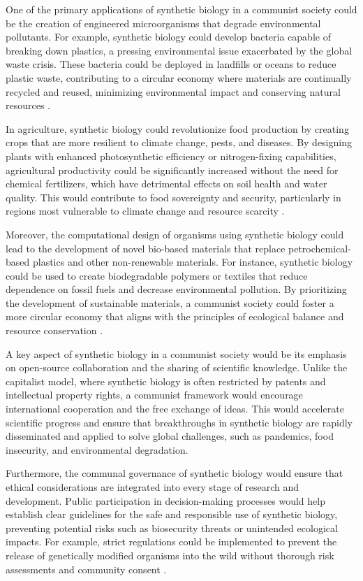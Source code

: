 One of the primary applications of synthetic biology in a communist society could be the creation of engineered microorganisms that degrade environmental pollutants. For example, synthetic biology could develop bacteria capable of breaking down plastics, a pressing environmental issue exacerbated by the global waste crisis. These bacteria could be deployed in landfills or oceans to reduce plastic waste, contributing to a circular economy where materials are continually recycled and reused, minimizing environmental impact and conserving natural resources \cite[pp.~220-225]{anderson2016biology}.

In agriculture, synthetic biology could revolutionize food production by creating crops that are more resilient to climate change, pests, and diseases. By designing plants with enhanced photosynthetic efficiency or nitrogen-fixing capabilities, agricultural productivity could be significantly increased without the need for chemical fertilizers, which have detrimental effects on soil health and water quality. This would contribute to food sovereignty and security, particularly in regions most vulnerable to climate change and resource scarcity \cite[pp.~310-315]{singh2017biosensors}.

Moreover, the computational design of organisms using synthetic biology could lead to the development of novel bio-based materials that replace petrochemical-based plastics and other non-renewable materials. For instance, synthetic biology could be used to create biodegradable polymers or textiles that reduce dependence on fossil fuels and decrease environmental pollution. By prioritizing the development of sustainable materials, a communist society could foster a more circular economy that aligns with the principles of ecological balance and resource conservation \cite[pp.~180-185]{diaz2018sustainability}.

A key aspect of synthetic biology in a communist society would be its emphasis on open-source collaboration and the sharing of scientific knowledge. Unlike the capitalist model, where synthetic biology is often restricted by patents and intellectual property rights, a communist framework would encourage international cooperation and the free exchange of ideas. This would accelerate scientific progress and ensure that breakthroughs in synthetic biology are rapidly disseminated and applied to solve global challenges, such as pandemics, food insecurity, and environmental degradation.

Furthermore, the communal governance of synthetic biology would ensure that ethical considerations are integrated into every stage of research and development. Public participation in decision-making processes would help establish clear guidelines for the safe and responsible use of synthetic biology, preventing potential risks such as biosecurity threats or unintended ecological impacts. For example, strict regulations could be implemented to prevent the release of genetically modified organisms into the wild without thorough risk assessments and community consent \cite[pp.~400-405]{rogers2018neurotechnology}.

